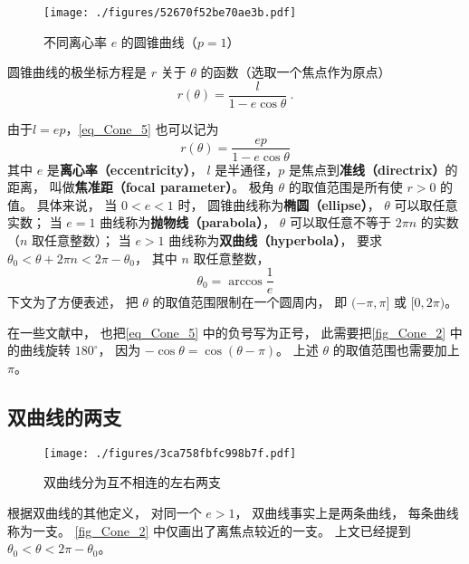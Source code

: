 

\begin{figure}[ht]
\centering
\texttt{[image: ./figures/52670f52be70ae3b.pdf]}
\caption{不同离心率 $e$ 的圆锥曲线（$p = 1$）} \label{fig_Cone_2}
\end{figure}

圆锥曲线的极坐标方程是 $r$ 关于 $\theta$ 的函数（选取一个焦点作为原点）
\begin{equation}\label{eq_Cone_5}
r(\theta)  = \frac{l}{1 - e\cos \theta }~.
\end{equation}

由于$l=ep$，\autoref{eq_Cone_5} 也可以记为
\begin{equation}\label{eq_Cone_3}
r(\theta) = \frac{ep}{1 - e\cos \theta }
\end{equation}
其中 $e$ 是\textbf{离心率（eccentricity）}， $l$ 是半通径，$p$ 是焦点到\textbf{准线（directrix）}的距离， 叫做\textbf{焦准距（focal parameter）}。 极角 $\theta$ 的取值范围是所有使 $r>0$ 的值。 具体来说， 当 $0 < e < 1$ 时， 圆锥曲线称为\textbf{椭圆（ellipse）}， $\theta$ 可以取任意实数； 当 $e = 1$ 曲线称为\textbf{抛物线（parabola）}， $\theta$ 可以取任意不等于 $2\pi n$ 的实数（$n$ 取任意整数）； 当 $e > 1$ 曲线称为\textbf{双曲线（hyperbola）}， 要求 $\theta_0< \theta + 2\pi n < 2\pi-\theta_0$， 其中 $n$ 取任意整数，
\begin{equation}
\theta_0 = \arccos\frac{1}{e}
\end{equation}
下文为了方便表述， 把 $\theta$ 的取值范围限制在一个圆周内， 即 $(-\pi,\pi]$ 或 $[0, 2\pi)$。

在一些文献中， 也把\autoref{eq_Cone_5} 中的负号写为正号， 此需要把\autoref{fig_Cone_2} 中的曲线旋转 $180^\circ$， 因为 $-\cos\theta = \cos(\theta - \pi)$。 上述 $\theta$ 的取值范围也需要加上 $\pi$。

\subsection{双曲线的两支}
\begin{figure}[ht]
\centering
\texttt{[image: ./figures/3ca758fbfc998b7f.pdf]}
\caption{双曲线分为互不相连的左右两支} \label{fig_Cone_3}
\end{figure}
根据双曲线的其他定义， 对同一个 $e>1$， 双曲线事实上是两条曲线， 每条曲线称为一支。 \autoref{fig_Cone_2} 中仅画出了离焦点较近的一支。 上文已经提到 $\theta_0< \theta < 2\pi-\theta_0$。

